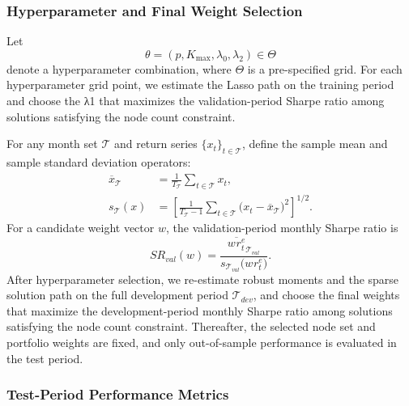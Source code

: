 \documentclass[12pt]{article}
\def\bm#1{#1}%
\def\mathrm#1{#1}%
\def\top{}%
\begin{document}
\subsubsection{Hyperparameter and Final Weight Selection}

Let
\begin{equation}
  \bm\theta
  =
  (p,K_{\max},\lambda_0,\lambda_2)
  \in\Theta
  \label{eq:hyperparameter_vector}
\end{equation}
denote a hyperparameter combination, where \(\Theta\) is a pre-specified grid. For each hyperparameter grid point, we estimate the Lasso path on the training period and choose the λ1 that maximizes the validation-period Sharpe ratio among solutions satisfying the node count constraint.

For any month set \(\mathcal T\) and return series \(\{x_t\}_{t\in\mathcal T}\), define the sample mean and sample standard deviation operators:
\begin{align}
  \overline{x}_{\mathcal T}
  &=
  \frac{1}{T_{\mathcal T}}
  \sum_{t\in\mathcal T}x_t,
  \label{eq:sample_mean_operator}\\
  s_{\mathcal T}(x)
  &=
  \left[
    \frac{1}{T_{\mathcal T}-1}
    \sum_{t\in\mathcal T}
    \bigl(x_t-\overline{x}_{\mathcal T}\bigr)^2
  \right]^{1/2}.
  \label{eq:sample_sd_operator}
\end{align}
For a candidate weight vector \(\bm w\), the validation-period monthly Sharpe ratio is
\begin{equation}
  \mathrm{SR}_{\mathrm{val}}(\bm w)
  =
  \frac{
    \overline{
      \bm w^{\top}\bm r_t^{e}
    }_{\mathcal T_{\mathrm{val}}}
  }{
    s_{\mathcal T_{\mathrm{val}}}
    \bigl(\bm w^{\top}\bm r_t^{e}\bigr)
  }.
  \label{eq:validation_sharpe}
\end{equation}
After hyperparameter selection, we re-estimate robust moments and the sparse solution path on the full development period \(\mathcal T_{\mathrm{dev}}\), and choose the final weights that maximize the development-period monthly Sharpe ratio among solutions satisfying the node count constraint. Thereafter, the selected node set and portfolio weights are fixed, and only out-of-sample performance is evaluated in the test period.

\subsubsection{Test-Period Performance Metrics}
\end{document}

